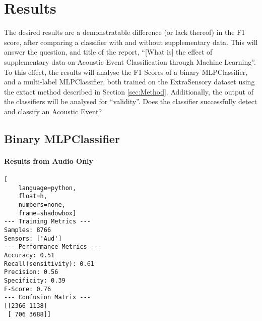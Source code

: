 \documentclass{UoNMCHA}
\newcommand{\inlineQuote}[1]{``#1''}
\numberwithin{equation}{section}
\begin{document}



\section{Results} \label{sec:Results}

The desired results are a demonstratable difference (or lack thereof) in the F1 score, after comparing a classifier with and without supplementary data.
This will answer the question, and title of the report, \inlineQuote{[What is] the  effect of supplementary data on Acoustic Event Classification through Machine Learning}. To this effect, the results will analyse the F1 Scores of a binary MLPClassifier, and a multi-label MLPClassifier, both trained on the ExtraSensory dataset using the extact method described in Section \ref{sec:Method}.
Additionally, the output of the classifiers will be analysed for \inlineQuote{validity}. Does the classifier successfully detect and classify an Acoustic Event?


\subsection{Binary MLPClassifier}

\paragraph{Results from Audio Only}
\begin{lstlisting}[
    language=python,
    float=h,
    numbers=none,
    frame=shadowbox]
--- Training Metrics ---
Samples: 8766
Sensors: ['Aud']
--- Performance Metrics ---
Accuracy: 0.51
Recall(sensitivity): 0.61
Precision: 0.56
Specificity: 0.39
F-Score: 0.76
--- Confusion Matrix ---
[[2366 1138]
 [ 706 3688]]
\end{lstlisting}
\end{document}
